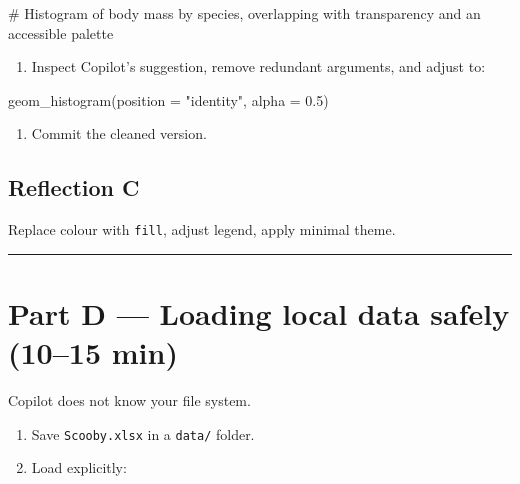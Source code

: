 \documentclass[
  letterpaper,
  DIV=11,
  numbers=noendperiod]{scrreprt}
\newenvironment{Shaded}{\begin{snugshade}}{\end{snugshade}}
\newcommand{\AttributeTok}[1]{\textcolor[rgb]{0.40,0.45,0.13}{#1}}
\newcommand{\CommentTok}[1]{\textcolor[rgb]{0.37,0.37,0.37}{#1}}
\newcommand{\FloatTok}[1]{\textcolor[rgb]{0.68,0.00,0.00}{#1}}
\newcommand{\FunctionTok}[1]{\textcolor[rgb]{0.28,0.35,0.67}{#1}}
\newcommand{\NormalTok}[1]{\textcolor[rgb]{0.00,0.23,0.31}{#1}}
\newcommand{\StringTok}[1]{\textcolor[rgb]{0.13,0.47,0.30}{#1}}
\providecommand{\tightlist}{%
  \setlength{\itemsep}{0pt}\setlength{\parskip}{0pt}}
\begin{document}
\begin{Shaded}
\begin{Highlighting}[]
\CommentTok{\# Histogram of body mass by species, overlapping with transparency and an accessible palette}
\end{Highlighting}
\end{Shaded}

\begin{enumerate}
\def\labelenumi{\arabic{enumi}.}
\setcounter{enumi}{1}
\tightlist
\item
  Inspect Copilot's suggestion, remove redundant arguments, and adjust
  to:
\end{enumerate}

\begin{Shaded}
\begin{Highlighting}[]
\FunctionTok{geom\_histogram}\NormalTok{(}\AttributeTok{position =} \StringTok{"identity"}\NormalTok{, }\AttributeTok{alpha =} \FloatTok{0.5}\NormalTok{)}
\end{Highlighting}
\end{Shaded}

\begin{enumerate}
\def\labelenumi{\arabic{enumi}.}
\setcounter{enumi}{2}
\tightlist
\item
  Commit the cleaned version.
\end{enumerate}

\subsection{Reflection C}\label{reflection-c}

Replace colour with \texttt{fill}, adjust legend, apply minimal theme.

\begin{center}\rule{0.5\linewidth}{0.5pt}\end{center}

\section{Part D --- Loading local data safely (10--15
min)}\label{part-d-loading-local-data-safely-1015-min}

Copilot does not know your file system.

\begin{enumerate}
\def\labelenumi{\arabic{enumi}.}
\tightlist
\item
  Save \texttt{Scooby.xlsx} in a \texttt{data/} folder.
\item
  Load explicitly:
\end{enumerate}
\end{document}
